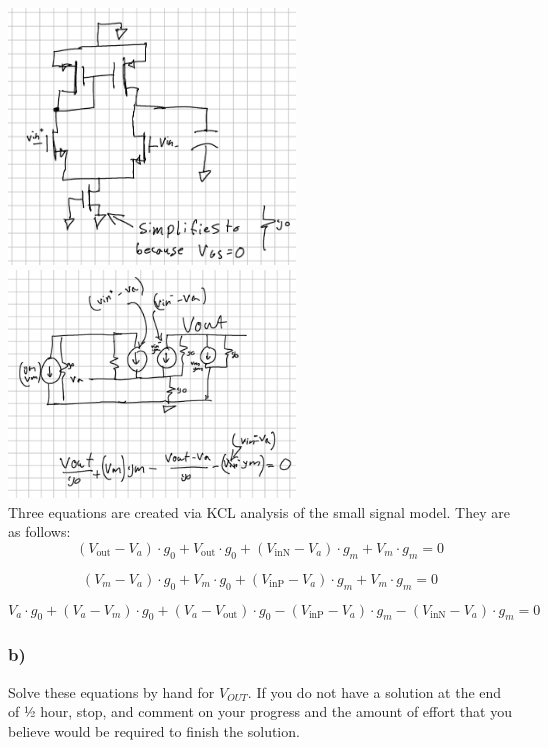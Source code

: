 \documentclass[10pt,a4paper]{article}
\begin{document}
\includegraphics[width=3in]{images/p1p1.png} \\
\includegraphics[width=3in]{images/p1p2.png} \\

Three equations are created via KCL analysis of the small signal model. They are as follows:\\

\[(V_{\text{out}} - V_{a}) \cdot g_0 + V_{\text{out}} \cdot g_0 + (V_{\text{inN}} - V_{a}) \cdot g_m + V_m \cdot g_m = 0\]

\[(V_m - V_{a}) \cdot g_0 + V_m \cdot g_0 + (V_{\text{inP}} - V_{a}) \cdot g_m + V_m \cdot g_m = 0\]

\[V_a \cdot g_0 + (V_a - V_m) \cdot g_0 + (V_a - V_{\text{out}}) \cdot g_0 - (V_{\text{inP}} - V_{a}) \cdot g_m - (V_{\text{inN}} - V_{a}) \cdot g_m = 0\]

\subsubsection*{b)}
Solve these equations by hand for \(V_{OUT}\). If you do not have a solution at
the end of ½ hour, stop, and comment on your progress and the amount of
effort that you believe would be required to finish the solution.\\
\end{document}
